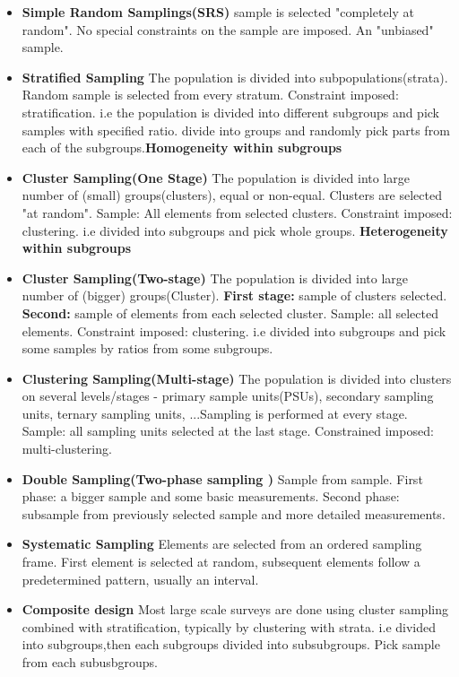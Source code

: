\documentclass{article}
\theoremstyle{definition}
\theoremstyle{thrm}
\theoremstyle{lma}
\theoremstyle{ppst}
\theoremstyle{crlr}
\begin{document}
\begin{itemize}
	\item \textbf{Simple Random Samplings(SRS)} sample is selected "completely at random". No special constraints on the sample are imposed. An "unbiased" sample. 
	\item \textbf{Stratified Sampling } The population is divided into subpopulations(strata). Random sample is selected from every stratum. Constraint imposed: stratification. i.e the population is divided into different subgroups and pick samples with specified ratio. divide into groups and randomly pick parts from each of the subgroups.\textbf{Homogeneity within subgroups}
	\item \textbf{Cluster Sampling(One Stage)} The population is divided into large number of (small) groups(clusters), equal or non-equal. Clusters are selected "at random". Sample: All elements from selected clusters. Constraint imposed: clustering. i.e divided into subgroups and pick whole groups. \textbf{Heterogeneity within subgroups}
	\item \textbf{Cluster Sampling(Two-stage)} The population is divided into large number of (bigger) groups(Cluster). \textbf{First stage: }sample of clusters selected. \textbf{Second: }sample of elements from each selected cluster. Sample: all selected elements. Constraint imposed: clustering. i.e divided into subgroups and pick some samples by ratios from some subgroups. 
	\item \textbf{Clustering Sampling(Multi-stage)} The population is divided into clusters on several levels/stages - primary sample units(PSUs), secondary sampling units, ternary sampling units, ...Sampling is performed at every stage.  Sample: all sampling units selected at the last stage.  Constrained imposed: multi-clustering.
	\item \textbf{Double Sampling(Two-phase sampling )} Sample from sample. First phase: a bigger sample and some basic measurements. Second phase: subsample from previously selected sample and more detailed measurements. 
	\item \textbf{Systematic Sampling} Elements are selected from an ordered sampling frame. First element is selected at random, subsequent elements follow a predetermined pattern, usually an interval.
	\item \textbf{Composite design} Most large scale surveys are done using cluster sampling combined with stratification, typically by clustering with strata. i.e divided into subgroups,then each subgroups divided into subsubgroups. Pick sample from each subusbgroups. 
\end{itemize}
\end{document}
